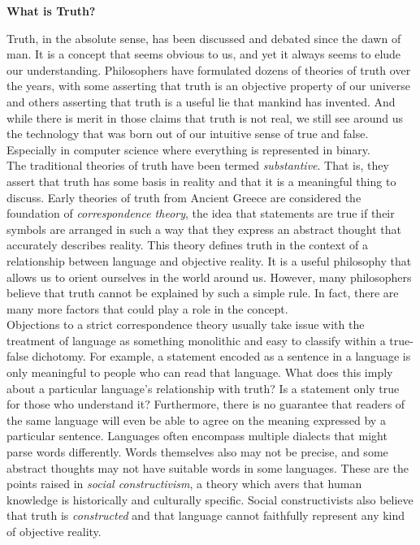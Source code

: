 \begin{tcolorbox}[breakable, enhanced, colback=textbook-blue, sharp corners]
	\vspace{3mm}
	\begin{center}
		\textbf{What is Truth?}
	\end{center}
	Truth, in the absolute sense, has been discussed and debated since the dawn of man. It is a concept that seems obvious to us, and yet it always seems to elude our understanding. Philosophers have formulated dozens of theories of truth over the years, with some asserting that truth is an objective property of our universe and others asserting that truth is a useful lie that mankind has invented. And while there is merit in those claims that truth is not real, we still see around us the technology that was born out of our intuitive sense of true and false. Especially in computer science where everything is represented in binary. \\
	
	The traditional theories of truth have been termed \textit{substantive}. That is, they assert that truth has some basis in reality and that it is a meaningful thing to discuss. Early theories of truth from Ancient Greece are considered the foundation of \textit{correspondence theory}, the idea that statements are true if their symbols are arranged in such a way that they express an abstract thought that accurately describes reality. This theory defines truth in the context of a relationship between language and objective reality. It is a useful philosophy that allows us to orient ourselves in the world around us. However, many philosophers believe that truth cannot be explained by such a simple rule. In fact, there are many more factors that could play a role in the concept. \\
	
	Objections to a strict correspondence theory usually take issue with the treatment of language as something monolithic and easy to classify within a true-false dichotomy. For example, a statement encoded as a sentence in a language is only meaningful to people who can read that language. What does this imply about a particular language's relationship with truth? Is a statement only true for those who understand it? Furthermore, there is no guarantee that readers of the same language will even be able to agree on the meaning expressed by a particular sentence. Languages often encompass multiple dialects that might parse words differently. Words themselves also may not be precise, and some abstract thoughts may not have suitable words in some languages. These are the points raised in \textit{social constructivism}, a theory which avers that human knowledge is historically and culturally specific. Social constructivists also believe that truth is \textit{constructed} and that language cannot faithfully represent any kind of objective reality. \\
	

\end{tcolorbox}
